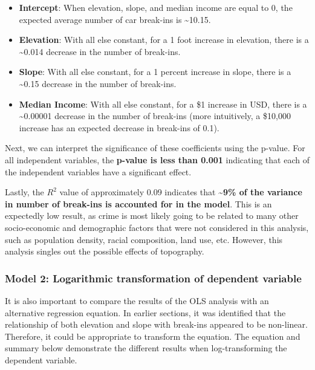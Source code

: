 \documentclass[
]{article}
\providecommand{\tightlist}{%
  \setlength{\itemsep}{0pt}\setlength{\parskip}{0pt}}
\begin{document}
\begin{itemize}
\tightlist
\item
  \textbf{Intercept}: When elevation, slope, and median income are equal
  to \(0\), the expected average number of car break-ins is
  \textasciitilde10.15.
\item
  \textbf{Elevation}: With all else constant, for a 1 foot increase in
  elevation, there is a \textasciitilde0.014 decrease in the number of
  break-ins.
\item
  \textbf{Slope}: With all else constant, for a 1 percent increase in
  slope, there is a \textasciitilde0.15 decrease in the number of
  break-ins.
\item
  \textbf{Median Income}: With all else constant, for a \$1 increase in
  USD, there is a \textasciitilde0.00001 decrease in the number of
  break-ins (more intuitively, a \$10,000 increase has an expected
  decrease in break-ins of 0.1).
\end{itemize}

Next, we can interpret the significance of these coefficients using the
p-value. For all independent variables, the \textbf{p-value is less than
0.001} indicating that each of the independent variables have a
significant effect.

Lastly, the \(R^2\) value of approximately 0.09 indicates that
\textbf{\textasciitilde9\% of the variance in number of break-ins is
accounted for in the model}. This is an expectedly low result, as crime
is most likely going to be related to many other socio-economic and
demographic factors that were not considered in this analysis, such as
population density, racial composition, land use, etc. However, this
analysis singles out the possible effects of topography.

\hypertarget{model-2-logarithmic-transformation-of-dependent-variable}{%
\subsubsection{Model 2: Logarithmic transformation of dependent
variable}\label{model-2-logarithmic-transformation-of-dependent-variable}}

It is also important to compare the results of the OLS analysis with an
alternative regression equation. In earlier sections, it was identified
that the relationship of both elevation and slope with break-ins
appeared to be non-linear. Therefore, it could be appropriate to
transform the equation. The equation and summary below demonstrate the
different results when log-transforming the dependent variable.
\end{document}

